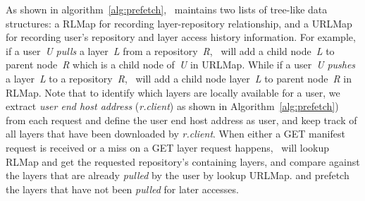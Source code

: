 
As shown in algorithm~\ref{alg:prefetch}, \sysname~maintains two lists of tree-like data structures: a RLMap for recording layer-repository
relationship, and 
a URLMap for recording 
user's repository and layer access history information. 
For example, if a user~\emph{U} \emph{pulls} a layer~\emph{L} from a repository~\emph{R},
\sysname~will add a child node~\emph{L} to parent node~\emph{R} which is a child node of~\emph{U} in URLMap.
While if a user~\emph{U} \emph{pushes} a  layer~\emph{L} to a repository~\emph{R},
\sysname~will add a child node layer~\emph{L} to parent node~\emph{R} in RLMap. 
Note that to identify which layers are locally available for a user, 
we extract \emph{user end host address} (\emph{r.client}) as shown in Algorithm~\ref{alg:prefetch}) from each request and define the user end host address as user,
and keep track of all layers that have been downloaded by \emph{r.client}. 
When either a GET manifest request is received or 
a miss on a GET layer request happens,
\sysname~will lookup RLMap and get the requested repository's containing layers,
and compare against the layers that are already \emph{pulled} by the user by lookup URLMap.
and prefetch the layers that have not been \emph{pulled} for later accesses.

 

